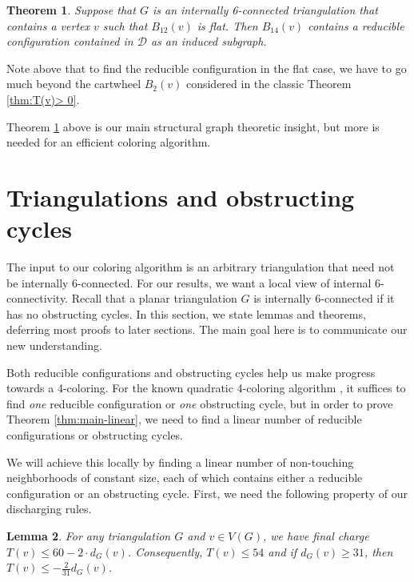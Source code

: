 \documentclass[10pt,a4paper]{article}
\newtheorem{thm}{Theorem}[section]
\newtheorem{lem}[thm]{Lemma}
\def\showlabel#1{}
\begin{document}
\begin{thm}\label{thm:basic-flat}
    Suppose that $G$ is an internally 6-connected triangulation that contains a vertex $v$ such that 
    $B_{12}(v)$ is flat. Then $B_{14}(v)$ 
    contains a reducible configuration contained in $\mathcal D$ as an induced subgraph.
\end{thm}
Note above that to find the reducible configuration in the flat case, we have to go much beyond the cartwheel $B_2(v)$ considered in the classic Theorem \ref{thm:T(v)> 0}.


Theorem \ref{thm:basic-flat} above is our main structural
graph theoretic insight, but more is needed for an efficient coloring algorithm. 





\section{Triangulations and obstructing cycles}

The input to our coloring algorithm is an arbitrary triangulation that need not be internally 6-connected.
For our results, we want a local view of internal 6-connectivity. Recall that a planar triangulation $G$ is internally 6-connected if it has no obstructing cycles. In this section, we state lemmas and theorems, deferring most proofs to later sections. The main goal here is to communicate our new understanding. 


Both reducible configurations and obstructing cycles help us make progress towards a 4-coloring. For the known quadratic 4-coloring algorithm \cite{RSST-STOC}, it suffices to find \emph{one} reducible configuration or \emph{one} obstructing cycle, but in order to prove Theorem \ref{thm:main-linear}, we need to find a linear number of reducible configurations or obstructing cycles.

We will achieve this locally by finding a linear number of non-touching neighborhoods of constant size, each of which contains either a reducible configuration or an obstructing cycle. 
First, we need the following property of our discharging rules.

\begin{lem}
\label{maxplus}\showlabel{maxplus} 
For any triangulation $G$ and $v \in V(G)$, we have final charge $T(v) \leq 60 - 2 \cdot d_G(v)$. 
Consequently, $T(v) \leq 54$ and if $d_G(v) \geq 31$, then $T(v) \le -\tfrac{2}{31} d_G(v)$.  
\end{lem}
\end{document}
